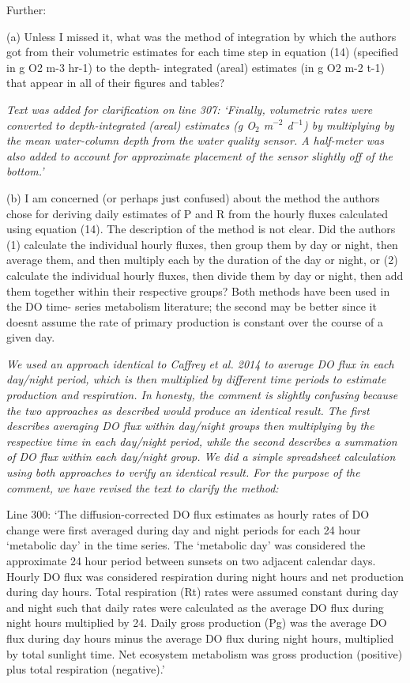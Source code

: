 \documentclass[letterpaper,12pt]{article}\usepackage[]{graphicx}\usepackage[]{color}
\begin{document}
Further:

(a) Unless I missed it, what was the method of integration by which the authors got from their volumetric estimates for each time step in equation (14) (specified in g O2 m-3 hr-1) to the depth- integrated (areal) estimates (in g O2 m-2 t-1) that appear in all of their figures and tables?

{\it Text was added for clarification on line 307: `Finally, volumetric rates were converted to depth-integrated (areal) estimates (g O$_2$ m$^{-2}$ d$^{-1}$) by multiplying by the mean water-column depth from the water quality sensor.  A half-meter was also added to account for approximate placement of the sensor slightly off of the bottom.' 
}

(b) I am concerned (or perhaps just confused) about the method the authors chose for deriving daily estimates of P and R from the hourly fluxes calculated using equation (14). The description of the method is not clear. Did the authors (1) calculate the individual hourly fluxes, then group them by day or night, then average them, and then multiply each by the duration of the day or night, or (2) calculate the individual hourly fluxes, then divide them by day or night, then add them together within their respective groups? Both methods have been used in the DO time- series metabolism literature; the second may be better since it doesnt assume the rate of primary production is constant over the course of a given day.

{\it We used an approach identical to Caffrey et al. 2014 to average DO flux in each day/night period, which is then multiplied by different time periods to estimate production and respiration.  In honesty, the comment is slightly confusing because the two approaches as described would produce an identical result.  The first describes averaging DO flux within day/night groups then multiplying by the respective time in each day/night period, while the second describes a summation of DO flux within each day/night group.  We did a simple spreadsheet calculation using both approaches to verify an identical result.  For the purpose of the comment, we have revised the text to clarify the method:

Line 300: `The diffusion-corrected DO flux estimates as hourly rates of DO change were first averaged during day and night periods for each 24 hour `metabolic day' in the time series. The `metabolic day' was considered the approximate 24 hour period between sunsets on two adjacent calendar days.  Hourly DO flux was considered respiration during night hours and net production during day hours.  Total respiration (Rt) rates were assumed constant during day and night such that daily rates were calculated as the average DO flux during night hours multiplied by 24. Daily gross production (Pg) was the average DO flux during day hours minus the average DO flux during night hours, multiplied by total sunlight time.  Net ecosystem metabolism was gross production (positive) plus total respiration (negative).'
}
\end{document}
